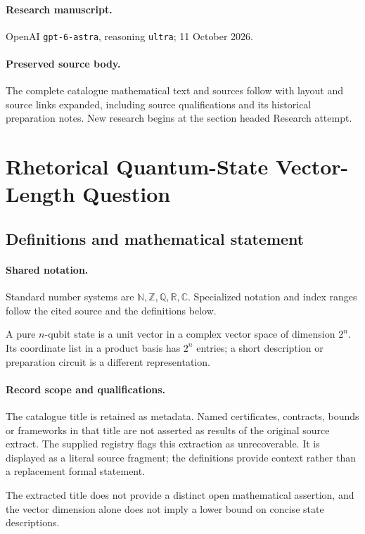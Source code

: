 \documentclass[11pt]{article}
\begin{document}
\paragraph{Research manuscript.} OpenAI \texttt{gpt-6-astra}, reasoning \texttt{ultra}; 11 October 2026.
\paragraph{Preserved source body.} The complete catalogue mathematical text and sources follow with layout and source links expanded, including source qualifications and its historical preparation notes. New research begins at the section headed Research attempt.

\section{Rhetorical Quantum-State Vector-Length Question}\label{statement}

\subsection{Definitions and mathematical statement}

\paragraph{Shared notation.}Standard number systems are $\mathbb N,\mathbb Z,\mathbb Q,\mathbb R,\mathbb C$. Specialized notation and index ranges follow the cited source and the definitions below.


A pure $n$-qubit state is a unit vector in a complex vector space of dimension $2^n$. Its coordinate list in a product basis has $2^n$ entries; a short description or preparation circuit is a different representation.
\paragraph{Record scope and qualifications.}
The catalogue title is retained as metadata. Named certificates, contracts, bounds or frameworks in that title are not asserted as results of the original source extract.
The supplied registry flags this extraction as unrecoverable. It is displayed as a literal source fragment; the definitions provide context rather than a replacement formal statement.

The extracted title does not provide a distinct open mathematical assertion, and the vector dimension alone does not imply a lower bound on concise state descriptions.
\end{document}
